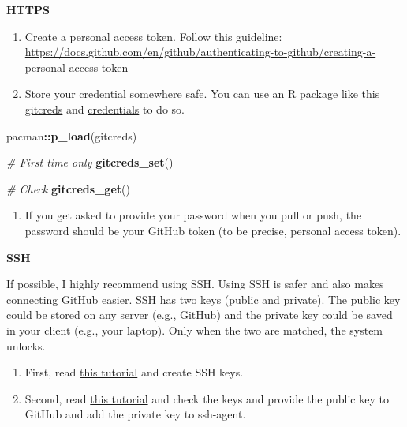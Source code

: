 \documentclass[
]{book}
\newenvironment{Shaded}{\begin{snugshade}}{\end{snugshade}}
\newcommand{\CommentTok}[1]{\textcolor[rgb]{0.56,0.35,0.01}{\textit{#1}}}
\newcommand{\FunctionTok}[1]{\textcolor[rgb]{0.13,0.29,0.53}{\textbf{#1}}}
\newcommand{\NormalTok}[1]{#1}
\newcommand{\SpecialCharTok}[1]{\textcolor[rgb]{0.81,0.36,0.00}{\textbf{#1}}}
\providecommand{\tightlist}{%
  \setlength{\itemsep}{0pt}\setlength{\parskip}{0pt}}
\begin{document}
\textbf{HTTPS}

\begin{enumerate}
\def\labelenumi{\arabic{enumi}.}
\item
  Create a personal access token. Follow this guideline: \url{https://docs.github.com/en/github/authenticating-to-github/creating-a-personal-access-token}
\item
  Store your credential somewhere safe. You can use an R package like this \href{https://gitcreds.r-lib.org/}{gitcreds} and \href{https://docs.ropensci.org/credentials/}{credentials} to do so.
\end{enumerate}

\begin{Shaded}
\begin{Highlighting}[]
\NormalTok{pacman}\SpecialCharTok{::}\FunctionTok{p\_load}\NormalTok{(gitcreds)}

\CommentTok{\# First time only}
\FunctionTok{gitcreds\_set}\NormalTok{()}

\CommentTok{\# Check}
\FunctionTok{gitcreds\_get}\NormalTok{()}
\end{Highlighting}
\end{Shaded}

\begin{enumerate}
\def\labelenumi{\arabic{enumi}.}
\setcounter{enumi}{2}
\tightlist
\item
  If you get asked to provide your password when you pull or push, the password should be your GitHub token (to be precise, personal access token).
\end{enumerate}

\textbf{SSH}

If possible, I highly recommend using SSH. Using SSH is safer and also makes connecting GitHub easier. SSH has two keys (public and private). The public key could be stored on any server (e.g., GitHub) and the private key could be saved in your client (e.g., your laptop). Only when the two are matched, the system unlocks.

\begin{enumerate}
\def\labelenumi{\arabic{enumi}.}
\item
  First, read \href{https://docs.github.com/en/github/authenticating-to-github/connecting-to-github-with-ssh}{this tutorial} and create SSH keys.
\item
  Second, read \href{https://happygitwithr.com/ssh-keys.html}{this tutorial} and check the keys and provide the public key to GitHub and add the private key to ssh-agent.
\end{enumerate}
\end{document}

